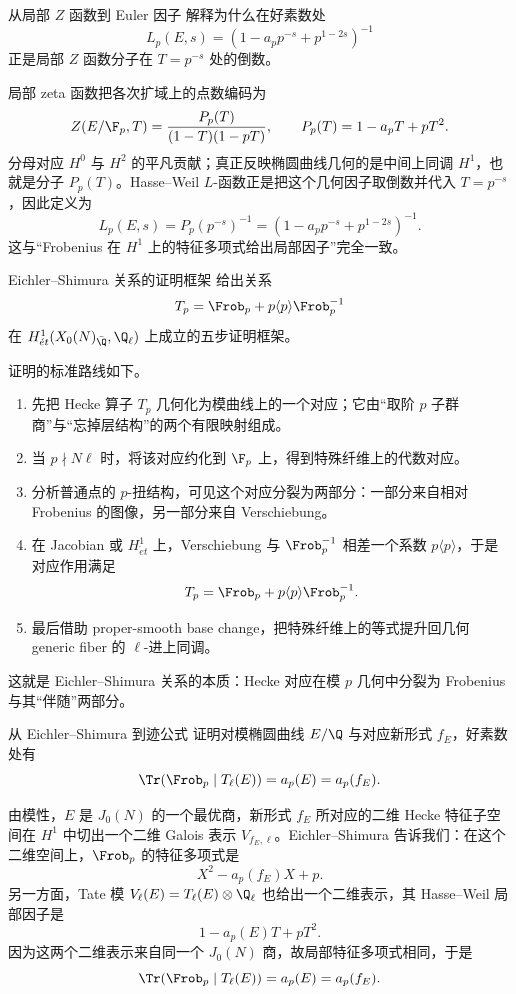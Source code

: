 \begin{problem}{从局部 $Z$ 函数到 Euler 因子 \medium}
解释为什么在好素数处
\[
L_p(E,s)=(1-a_pp^{-s}+p^{1-2s})^{-1}
\]
正是局部 $Z$ 函数分子在 $T=p^{-s}$ 处的倒数。
\end{problem}
\begin{solution}
局部 zeta 函数把各次扩域上的点数编码为
\[
Z(E/\F_p,T)=\frac{P_p(T)}{(1-T)(1-pT)},
\qquad P_p(T)=1-a_pT+pT^2.
\]
分母对应 $H^0$ 与 $H^2$ 的平凡贡献；真正反映椭圆曲线几何的是中间上同调 $H^1$，也就是分子 $P_p(T)$。Hasse--Weil $L$-函数正是把这个几何因子取倒数并代入 $T=p^{-s}$，因此定义为
\[
L_p(E,s)=P_p(p^{-s})^{-1}=(1-a_pp^{-s}+p^{1-2s})^{-1}.
\]
这与“Frobenius 在 $H^1$ 上的特征多项式给出局部因子”完全一致。
\end{solution}

\begin{problem}{Eichler--Shimura 关系的证明框架 \medium}
给出关系
\[
T_p=\Frob_p+p\langle p\rangle\Frob_p^{-1}
\]
在 $H^1_{\acute et}(X_0(N)_{\bar\Q},\Q_\ell)$ 上成立的五步证明框架。
\end{problem}
\begin{solution}
证明的标准路线如下。
\begin{enumerate}[label=\arabic*.]
  \item 先把 Hecke 算子 $T_p$ 几何化为模曲线上的一个对应；它由“取阶 $p$ 子群商”与“忘掉层结构”的两个有限映射组成。
  \item 当 $p\nmid N\ell$ 时，将该对应约化到 $\F_p$ 上，得到特殊纤维上的代数对应。
  \item 分析普通点的 $p$-扭结构，可见这个对应分裂为两部分：一部分来自相对 Frobenius 的图像，另一部分来自 Verschiebung。
  \item 在 Jacobian 或 $H^1_{\acute et}$ 上，Verschiebung 与 $\Frob_p^{-1}$ 相差一个系数 $p\langle p\rangle$，于是对应作用满足
  \[
  T_p=\Frob_p+p\langle p\rangle\Frob_p^{-1}.
  \]
  \item 最后借助 proper-smooth base change，把特殊纤维上的等式提升回几何 generic fiber 的 $\ell$-进上同调。
\end{enumerate}
这就是 Eichler--Shimura 关系的本质：Hecke 对应在模 $p$ 几何中分裂为 Frobenius 与其“伴随”两部分。
\end{solution}

\begin{problem}{从 Eichler--Shimura 到迹公式 \medium}
证明对模椭圆曲线 $E/\Q$ 与对应新形式 $f_E$，好素数处有
\[
\Tr(\Frob_p\mid T_\ell(E))=a_p(E)=a_p(f_E).
\]
\end{problem}
\begin{solution}
由模性，$E$ 是 $J_0(N)$ 的一个最优商，新形式 $f_E$ 所对应的二维 Hecke 特征子空间在 $H^1$ 中切出一个二维 Galois 表示 $V_{f_E,\ell}$。Eichler--Shimura 告诉我们：在这个二维空间上，$\Frob_p$ 的特征多项式是
\[
X^2-a_p(f_E)X+p.
\]
另一方面，Tate 模 $V_\ell(E)=T_\ell(E)\otimes\Q_\ell$ 也给出一个二维表示，其 Hasse--Weil 局部因子是
\[
1-a_p(E)T+pT^2.
\]
因为这两个二维表示来自同一个 $J_0(N)$ 商，故局部特征多项式相同，于是
\[
\Tr(\Frob_p\mid T_\ell(E))=a_p(E)=a_p(f_E).
\]
\end{solution}

